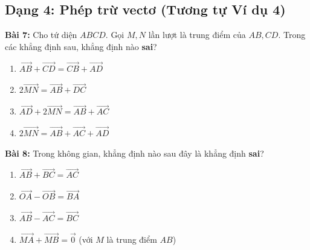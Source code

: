 \documentclass[12pt,a4paper]{article}
\begin{document}
\subsection*{Dạng 4: Phép trừ vectơ (Tương tự Ví dụ 4)}
\textbf{Bài 7:} Cho tứ diện $ABCD$. Gọi $M, N$ lần lượt là trung điểm của $AB, CD$. Trong các khẳng định sau, khẳng định nào \textbf{sai}?
\begin{enumerate}[label=\Alph*.]
    \item $\vec{AB} + \vec{CD} = \vec{CB} + \vec{AD}$
    \item $2\vec{MN} = \vec{AB} + \vec{DC}$
    \item $\vec{AD} + 2\vec{MN} = \vec{AB} + \vec{AC}$
    \item $2\vec{MN} = \vec{AB} + \vec{AC} + \vec{AD}$
\end{enumerate}

\textbf{Bài 8:} Trong không gian, khẳng định nào sau đây là khẳng định \textbf{sai}?
\begin{enumerate}[label=\Alph*.]
    \item $\vec{AB} + \vec{BC} = \vec{AC}$
    \item $\vec{OA} - \vec{OB} = \vec{BA}$
    \item $\vec{AB} - \vec{AC} = \vec{BC}$
    \item $\vec{MA} + \vec{MB} = \vec{0}$ (với $M$ là trung điểm $AB$)
\end{enumerate}

\vspace{0.5cm}
\end{document}
